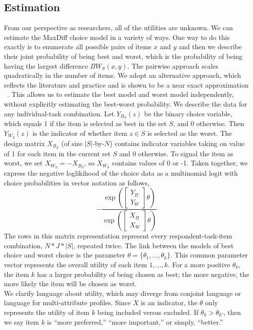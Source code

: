 \documentclass[nonblindrev]{informs3}
\begin{document}
\subsection{Estimation}
From our perspective as researchers, all of the utilities are unknown. We can estimate the MaxDiff choice model in a variety of ways. One way to do this exactly is to enumerate all possible pairs of items $x$ and $y$ and then we describe their joint probability of being best and worst, which is the probability of being having the largest difference $BW_S(x,y)$. The pairwise approach scales quadratically in the number of items. We adopt an alternative approach, which reflects the literature and practice and is shown to be a near exact approximation ~\cite{cohen2003maximum}. This allows us to estimate the best model and worst model independently, without explicitly estimating the best-worst probability. 
We describe the data for any individual-task combination. Let $Y_{B_S}(z)$ be the binary choice variable, which equals 1 if the item is selected as best in the set $S$, and 0 otherwise. Then $Y_{W_S}(z)$ is the indicator of whether item $z \in S$ is selected as the worst. The design matrix $X_{B_S}$ (of size $|S|$-by-$N$) contains indicator variables taking on value of 1 for each item in the current set $S$ and 0 otherwise. To signal the item as worst, we set $X_{W_S}=-X_{B_S}$, so $X_{W_S}$ contains values of 0 or -1.  Taken together, we express the negative loglikihood of the choice data as a multinomial logit with choice probabilities in vector notation as follows,
\[
-\frac{\exp{(\begin{bmatrix}Y_B\\Y_W\end{bmatrix}\theta)}}{\exp{(\begin{bmatrix}X_B\\X_W\end{bmatrix}\theta)}}
\]
The rows in this matrix representation represent every respondent-task-item combination, $N*J*|S|$, repeated twice.  
The link between the models of best choice and worst choice is the parameter $\theta=\{\theta_1,\ldots,\theta_k \}$. This common parameter vector represents the overall utility of each item $1,\ldots,k$. For a more positive $\theta_k$, the item $k$ has a larger probability of being chosen as best; the more negative, the more likely the item will be chosen as worst.\\
We clarify language about utility, which may diverge from conjoint language or language for multi-attribute profiles. Since $X$ is an indicator, the $\theta$ only represents the utility of item $k$ being included versus excluded. If $\theta_k > \theta_{k'}$, then we say item $k$ is ``more preferred,'' ``more important,'' or simply, ``better.''\\
\end{document}
